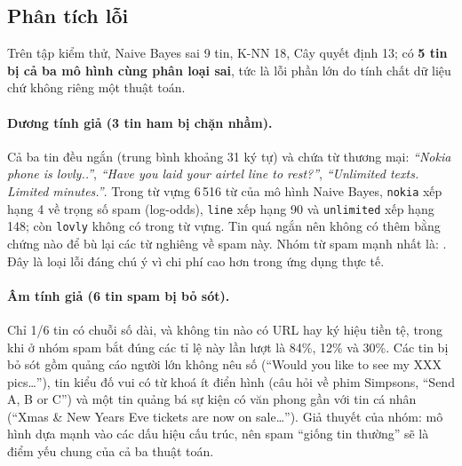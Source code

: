 \documentclass[12pt,a4paper]{article}
\begin{document}
\subsection{Phân tích lỗi}
Trên tập kiểm thử, Naive Bayes sai 9 tin, K-NN 18, Cây quyết định 13; có \textbf{5 tin bị cả ba mô hình cùng phân loại sai}, tức là lỗi phần lớn do tính chất dữ liệu chứ không riêng một thuật toán.

\paragraph{Dương tính giả (3 tin ham bị chặn nhầm).} Cả ba tin đều ngắn (trung bình khoảng 31 ký tự) và chứa từ thương mại: \emph{``Nokia phone is lovly..''}, \emph{``Have you laid your airtel line to rest?''}, \emph{``Unlimited texts. Limited minutes.''}. Trong từ vựng 6\,516 từ của mô hình Naive Bayes, \texttt{nokia} xếp hạng 4 về trọng số spam (log-odds), \texttt{line} xếp hạng 90 và \texttt{unlimited} xếp hạng 148; còn \texttt{lovly} không có trong từ vựng. Tin quá ngắn nên không có thêm bằng chứng nào để bù lại các từ nghiêng về spam này. Nhóm từ spam mạnh nhất là: \NBtopspam. Đây là loại lỗi đáng chú ý vì chi phí cao hơn trong ứng dụng thực tế.

\paragraph{Âm tính giả (6 tin spam bị bỏ sót).} Chỉ 1/6 tin có chuỗi số dài, và không tin nào có URL hay ký hiệu tiền tệ, trong khi ở nhóm spam bắt đúng các tỉ lệ này lần lượt là 84\%, 12\% và 30\%. Các tin bị bỏ sót gồm quảng cáo người lớn không nêu số (``Would you like to see my XXX pics\ldots''), tin kiểu đố vui có từ khoá ít điển hình (câu hỏi về phim Simpsons, ``Send A, B or C'') và một tin quảng bá sự kiện có văn phong gần với tin cá nhân (``Xmas \& New Years Eve tickets are now on sale\ldots''). Giả thuyết của nhóm: mô hình dựa mạnh vào các dấu hiệu cấu trúc, nên spam ``giống tin thường'' sẽ là điểm yếu chung của cả ba thuật toán.
\end{document}
